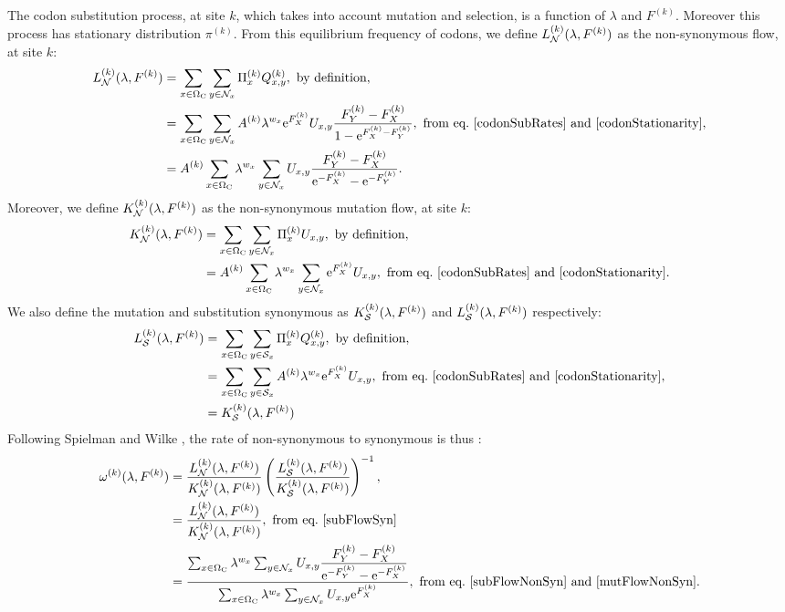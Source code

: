 The \gls{codon} \gls{substitution} process, at site $k$, which takes into account mutation and selection, is a function of $\lambda$ and $F^{(k)}$. Moreover this process has stationary distribution $\pi^{(k)}$. From this equilibrium frequency of \glspl{codon}, we define $L_{\mathcal{N}}^{(k)}(\lambda, F^{(k)})$ as the \gls{non-synonymous} flow, at site $k$:
\begin{align}
L_{\NonSyn}^{(k)}(\lambda, F^{(k)})
& =  \sum_{x \in \SetCodon} \sum_{y \in \NxNonSyn} \Pi_x^{(k)} Q_{x, y}^{(k)}, \ \textrm{by definition},\\
& =\sum_{x \in \SetCodon} \sum_{y \in \NxNonSyn} A^{(k)} \lambda^{w_x} \e^{F_X^{(k)}} U_{x, y} \dfrac{F_Y^{(k)} - F_X^{(k)}}{1 - \e^{F_X^{(k)} - F_Y^{(k)}}}, \ \textrm{from eq.}\ \ref{codonSubRates} \ \text{and} \ \ref{codonStationarity},\\
& =A^{(k)} \sum_{x \in \SetCodon} \lambda^{w_x} \sum_{y \in \NxNonSyn}  U_{x, y} \dfrac{F_Y^{(k)} - F_X^{(k)}}{\e^{-F_X^{(k)}} - \e^{ - F_Y^{(k)}}}.
\label{subFlowNonSyn}
\end{align}
Moreover, we define $K_{\mathcal{N}}^{(k)}(\lambda, F^{(k)})$ as the non-synonymous mutation flow, at site $k$:
\begin{align}
K_{\NonSyn}^{(k)}(\lambda, F^{(k)})
& =  \sum_{x \in \SetCodon} \sum_{y \in \NxNonSyn} \Pi_x^{(k)} U_{x, y}, \ \textrm{by definition},\\
& = A^{(k)}  \sum_{x \in \SetCodon} \lambda^{w_x} \sum_{y \in \NxNonSyn} \e^{F_X^{(k)}} U_{x, y}, \ \textrm{from eq.}\ \ref{codonSubRates} \ \text{and} \ \ref{codonStationarity}.
\label{mutFlowNonSyn}
\end{align}
We also define the mutation and \gls{substitution} synonymous as $K_{\mathcal{S}}^{(k)}(\lambda, F^{(k)})$ and $L_{\mathcal{S}}^{(k)}(\lambda, F^{(k)})$ respectively:
\begin{align}
L_{\Syn}^{(k)}(\lambda, F^{(k)})
& =  \sum_{x \in \SetCodon} \sum_{y \in \NxSyn} \Pi_x^{(k)} Q_{x, y}^{(k)}, \ \textrm{by definition},\\
& =\sum_{x \in \SetCodon} \sum_{y \in \NxSyn} A^{(k)} \lambda^{w_x} \e^{F_X^{(k)}} U_{x, y}, \ \textrm{from eq.}\ \ref{codonSubRates} \ \text{and} \ \ref{codonStationarity}, \\
& =K_{\Syn}^{(k)}(\lambda, F^{(k)})
\label{subFlowSyn}
\end{align}
Following Spielman and Wilke \citep{Spielman2015}, the rate of non-synonymous to \gls{synonymous} is thus :
\begin{align}
\omega^{(k)}(\lambda, F^{(k)})
& =\dfrac{L_{\NonSyn}^{(k)}(\lambda, F^{(k)})}{K_{\NonSyn}^{(k)}(\lambda, F^{(k)})}  \left( \dfrac{L_{\Syn}^{(k)}(\lambda, F^{(k)})}{K_{\Syn}^{(k)}(\lambda, F^{(k)})}  \right)^{-1}, \\
& =\dfrac{L_{\NonSyn}^{(k)}(\lambda, F^{(k)})}{K_{\NonSyn}^{(k)}(\lambda, F^{(k)})}, \ \textrm{from eq.}\ \ref{subFlowSyn} \\
& =\dfrac{ \sum_{x \in \SetCodon} \lambda^{w_x} \sum_{y \in \NxNonSyn}  U_{x, y} \dfrac{F_Y^{(k)} - F_X^{(k)}}{\e^{ - F_Y^{(k)}} -  \e^{- F_X^{(k)}} } }{ \sum_{x \in \SetCodon}  \lambda^{w_x} \sum_{y \in \NxNonSyn} U_{x, y} \e^{F_X^{(k)}} }, \ \textrm{from eq.}\ \ref{subFlowNonSyn} \ \text{and} \ \ref{mutFlowNonSyn}.
\label{omegaSite}
\end{align}
